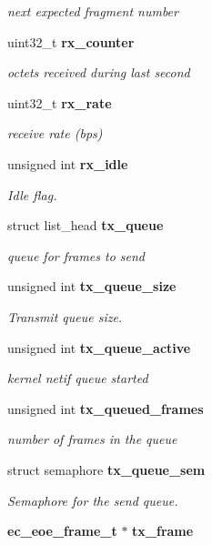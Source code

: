 \begin{DoxyCompactItemize}
\begin{DoxyCompactList}\small\item\em next expected fragment number \end{DoxyCompactList}\item 
uint32\-\_\-t {\bf rx\-\_\-counter}\label{structec__eoe_a94ade8d6e6250de7d04b86160b83c22c}

\begin{DoxyCompactList}\small\item\em octets received during last second \end{DoxyCompactList}\item 
uint32\-\_\-t {\bf rx\-\_\-rate}\label{structec__eoe_a1062493d151d4b2ad4e0392673ad1507}

\begin{DoxyCompactList}\small\item\em receive rate (bps) \end{DoxyCompactList}\item 
unsigned int {\bf rx\-\_\-idle}
\begin{DoxyCompactList}\small\item\em \-Idle flag. \end{DoxyCompactList}\item 
struct list\-\_\-head {\bf tx\-\_\-queue}\label{structec__eoe_afd6bcfa6f1ad2bfb371439776b2ca8a9}

\begin{DoxyCompactList}\small\item\em queue for frames to send \end{DoxyCompactList}\item 
unsigned int {\bf tx\-\_\-queue\-\_\-size}
\begin{DoxyCompactList}\small\item\em \-Transmit queue size. \end{DoxyCompactList}\item 
unsigned int {\bf tx\-\_\-queue\-\_\-active}\label{structec__eoe_a167ab3458420a60abec520dd0c73e5d5}

\begin{DoxyCompactList}\small\item\em kernel netif queue started \end{DoxyCompactList}\item 
unsigned int {\bf tx\-\_\-queued\-\_\-frames}\label{structec__eoe_a3ec0e5dc97f984769403f00230e53f03}

\begin{DoxyCompactList}\small\item\em number of frames in the queue \end{DoxyCompactList}\item 
struct semaphore {\bf tx\-\_\-queue\-\_\-sem}
\begin{DoxyCompactList}\small\item\em \-Semaphore for the send queue. \end{DoxyCompactList}\item 
{\bf ec\-\_\-eoe\-\_\-frame\-\_\-t} $\ast$ {\bf tx\-\_\-frame}\label{structec__eoe_a5f814555b215fa648246d3e4b8952db4}


\end{DoxyCompactItemize}
